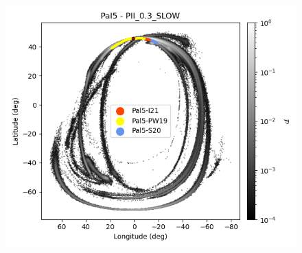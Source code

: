 \begin{figure}[h!]
\begin{center}
                    \includegraphics[clip=true, trim = 0mm 0mm 0mm 0mm, width=0.65\columnwidth]{images/PII_0.3_SLOW_individual_Pal5_galstream-Pal5-l-b.png}


\end{center}
\end{figure}
